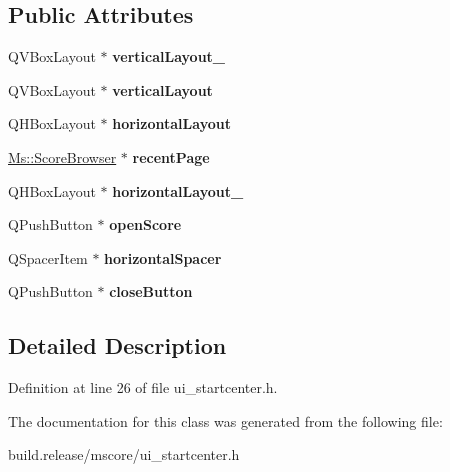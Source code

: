 \subsection*{Public Attributes}
\begin{DoxyCompactItemize}
\item 
\mbox{\label{class_ui___startcenter_a2106141c82462c8c3c085798cdb49a8d}} 
Q\+V\+Box\+Layout $\ast$ {\bfseries vertical\+Layout\+\_}
\item 
\mbox{\label{class_ui___startcenter_af21040f32e5267f44c6c1a36dbbd5bc1}} 
Q\+V\+Box\+Layout $\ast$ {\bfseries vertical\+Layout}
\item 
\mbox{\label{class_ui___startcenter_a71f3645961a5a9e5c1a50fd4c5f47233}} 
Q\+H\+Box\+Layout $\ast$ {\bfseries horizontal\+Layout}
\item 
\mbox{\label{class_ui___startcenter_ad96ba1ecb8820f9e45b62186d8a9bda6}} 
\hyperlink{class_ms_1_1_score_browser}{Ms\+::\+Score\+Browser} $\ast$ {\bfseries recent\+Page}
\item 
\mbox{\label{class_ui___startcenter_a81c49a047bf20ca0c669e411e2ea2d38}} 
Q\+H\+Box\+Layout $\ast$ {\bfseries horizontal\+Layout\+\_}
\item 
\mbox{\label{class_ui___startcenter_a840104e2632e5bf1a373c14ce833d3ba}} 
Q\+Push\+Button $\ast$ {\bfseries open\+Score}
\item 
\mbox{\label{class_ui___startcenter_a8894890d735255a5b21dad79e5993e15}} 
Q\+Spacer\+Item $\ast$ {\bfseries horizontal\+Spacer}
\item 
\mbox{\label{class_ui___startcenter_a884da5be4cc33680a1b6bf734109109c}} 
Q\+Push\+Button $\ast$ {\bfseries close\+Button}
\end{DoxyCompactItemize}


\subsection{Detailed Description}


Definition at line 26 of file ui\+\_\+startcenter.\+h.



The documentation for this class was generated from the following file\+:\begin{DoxyCompactItemize}
\item 
build.\+release/mscore/ui\+\_\+startcenter.\+h\end{DoxyCompactItemize}
